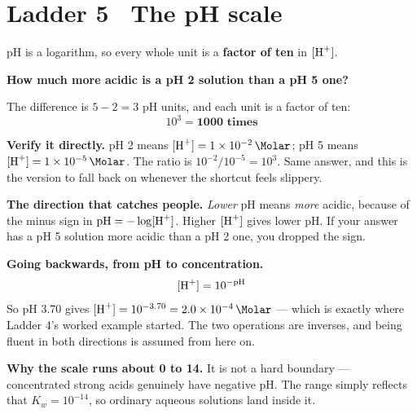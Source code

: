 \documentclass{apchem-worksheet}
\begin{document}
\section*{\sffamily Ladder 5 \textbullet\ The pH scale}

pH is a logarithm, so every whole unit is a \textbf{factor of ten} in
$[\ce{H+}]$.

\begin{center}
\end{center}

\begin{workedexample}
\textbf{How much more acidic is a pH 2 solution than a pH 5 one?}

The difference is $5 - 2 = 3$ pH units, and each unit is a factor of
ten:
\[ 10^{3} = \mathbf{1000 \text{ times}} \]

\textbf{Verify it directly.} pH 2 means $[\ce{H+}] =
\SI{1e-2}{\Molar}$; pH 5 means $[\ce{H+}] = \SI{1e-5}{\Molar}$. The
ratio is $10^{-2}/10^{-5} = 10^{3}$. Same answer, and this is the
version to fall back on whenever the shortcut feels slippery.

\textbf{The direction that catches people.} \emph{Lower} pH means
\emph{more} acidic, because of the minus sign in $\text{pH} =
-\log[\ce{H+}]$. Higher $[\ce{H+}]$ gives lower pH. If your answer has a
pH 5 solution more acidic than a pH 2 one, you dropped the sign.

\textbf{Going backwards, from pH to concentration.}
\[ [\ce{H+}] = 10^{-\text{pH}} \]
So pH 3.70 gives $[\ce{H+}] = 10^{-3.70} = \SI{2.0e-4}{\Molar}$ ---
which is exactly where Ladder 4's worked example started. The two
operations are inverses, and being fluent in both directions is
assumed from here on.

\textbf{Why the scale runs about 0 to 14.} It is not a hard boundary
--- concentrated strong acids genuinely have negative pH. The range
simply reflects that $K_{w} = 10^{-14}$, so ordinary aqueous solutions
land inside it.
\end{workedexample}
\end{document}
